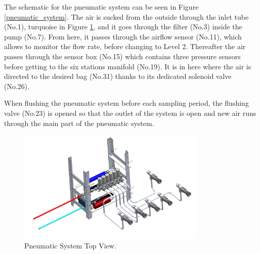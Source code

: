 The schematic for the pneumatic system can be seen in Figure \ref{pneumatic_system}. The air is sucked from the outside through the inlet tube (No.1), turquoise in Figure \ref{pneumatic_system_cad}, and it goes through the filter (No.3) inside the pump (No.7). From here, it passes through the airflow sensor (No.11), which allows to monitor the flow rate, before changing to Level 2. Thereafter the air passes through the sensor box (No.15) which contains three pressure sensors before getting to the six stations manifold (No.19). It is in here where the air is directed to the desired bag (No.31) thanks to its dedicated solenoid valve (No.26).

When flushing the pneumatic system before each sampling period, the flushing valve (No.23) is opened so that the outlet of the system is open and new air runs through the main part of the pneumatic system. 


\begin{figure}[H]
    \centering
   \includegraphics[width=0.8\textwidth]{4-experiment-design/img/Mechanical/Pneumatic_System.png}
   \caption{Pneumatic System Top View.}
    \label{pneumatic_system_cad}
\end{figure}

